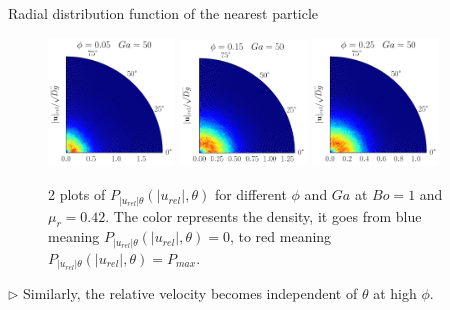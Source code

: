 \documentclass{sintefbeamer}
\begin{document}
\begin{frame}{Radial distribution function of the nearest particle}
  \begin{figure}[h!]
    \centering
    \includegraphics[width =0.3\textwidth]{image/N_10/beta/2DMAP_theta_v_rel_dmin_10_Bo1PHI0_05mu_r0_42Ga50.pdf}
    \includegraphics[width =0.3\textwidth]{image/N_10/beta/2DMAP_theta_v_rel_dmin_10_Bo1PHI0_15mu_r0_42Ga50.pdf}
    \includegraphics[width =0.3\textwidth]{image/N_10/beta/2DMAP_theta_v_rel_dmin_10_Bo1PHI0_25mu_r0_42Ga50.pdf}
    \caption{2 plots of $P_{|u_{rel}|\theta}(|u_{rel}|,\theta)$ for different $\phi$ and $Ga$ at $Bo = 1$ and $\mu_r = 0.42$. The color represents the density, it goes from blue meaning $P_{|u_{rel}|\theta}(|u_{rel}|,\theta)= 0$, to red meaning $P_{|u_{rel}|\theta}(|u_{rel}|,\theta) = P_{max}$.} 
\end{figure} 
$\triangleright$ Similarly, the relative velocity  becomes independent of $\theta$ at high $\phi$.
\end{frame}
\end{document}
